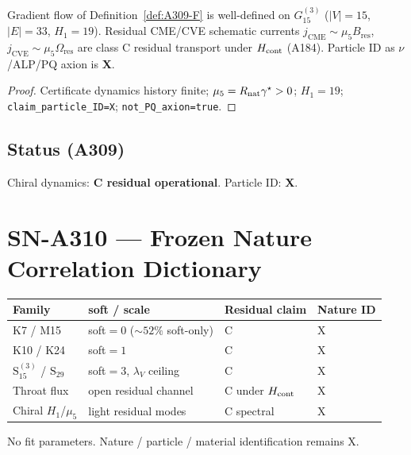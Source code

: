 \begin{theorem}
\label{thm:A309-dyn}
Gradient flow of Definition~\ref{def:A309-F} is well-defined on $G_{15}^{(3)}$
($|V|=15$, $|E|=33$, $H_1=19$). Residual CME/CVE schematic currents
$j_{\mathrm{CME}}\sim\mu_5 B_{\mathrm{res}}$, $j_{\mathrm{CVE}}\sim\mu_5\Omega_{\mathrm{res}}$
are class C residual transport under $H_{\rm cont}$ (A184). Particle ID as $\nu$/ALP/PQ axion is \textbf{X}.
\end{theorem}

\begin{proof}
Certificate dynamics history finite; $\mu_5=R_{\rm nat}\gamma^\star>0$; $H_1=19$;
\texttt{claim\_particle\_ID=X}; \texttt{not\_PQ\_axion=true}.
\end{proof}

\subsection*{Status (A309)}
Chiral dynamics: \textbf{C residual operational}. Particle ID: \textbf{X}.

\section{SN-A310 --- Frozen Nature Correlation Dictionary}
\label{sec:SN-A310}

\begin{theorem}
\label{thm:A310}
\begin{center}
\begin{tabular}{@{}llll@{}}
\toprule
Family & soft / scale & Residual claim & Nature ID \\
\midrule
K7 / M15 & soft$=0$ ($\sim 52\%$ soft-only) & C & X \\
K10 / K24 & soft$=1$ & C & X \\
$\mathrm{S}_{15}^{(3)}$ / $\mathrm{S}_{29}$ & soft$=3$, $\lambda_V$ ceiling & C & X \\
Throat flux & open residual channel & C under $H_{\rm cont}$ & X \\
Chiral $H_1$/$\mu_5$ & light residual modes & C spectral & X \\
\bottomrule
\end{tabular}
\end{center}
No fit parameters. Nature / particle / material identification remains X.
\end{theorem}

